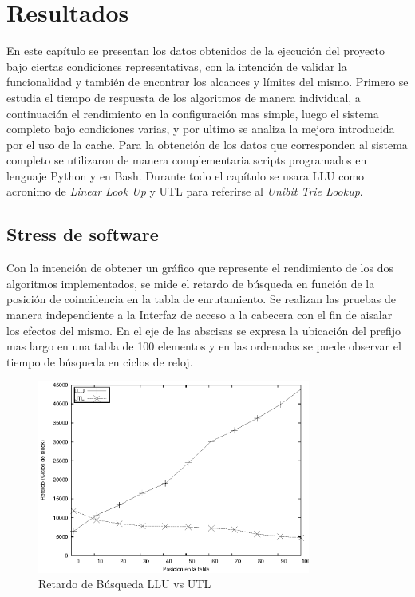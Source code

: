 \chapter{Resultados}

En este capítulo se presentan los datos obtenidos de la ejecución del proyecto bajo ciertas condiciones representativas, con la intención de validar la funcionalidad y también de encontrar los alcances y límites del mismo. Primero se estudia el tiempo de respuesta de los algoritmos de manera individual, a continuación el rendimiento en la configuración mas simple, luego el sistema completo bajo condiciones varias, y por ultimo se analiza la mejora introducida por el uso de la cache. Para la obtención de los datos que corresponden al sistema completo se utilizaron de manera complementaria scripts programados en lenguaje Python y en Bash. Durante todo el capítulo se usara LLU como acronimo de \textit{Linear Look Up} y UTL para referirse al \textit{Unibit Trie Lookup}. 


\section{Stress de software}

Con la intención de obtener un gráfico que represente el rendimiento de los dos algoritmos implementados, se mide el retardo de búsqueda en función de la posición de coincidencia en la tabla de enrutamiento. Se realizan las pruebas de manera independiente a la Interfaz de acceso a la cabecera con el fin de aisalar los efectos del mismo. En el eje de las abscisas se expresa la ubicación del prefijo mas largo en una tabla de 100 elementos  y en las ordenadas se puede observar el tiempo de búsqueda en ciclos de reloj.

\begin{figure}[h]
  \centering
	\includegraphics[width=0.8\textwidth]{5-resultados/graf/llu-utlsof.eps}
  \caption{Retardo de Búsqueda LLU vs UTL}
  \label{fig}
\end{figure}

